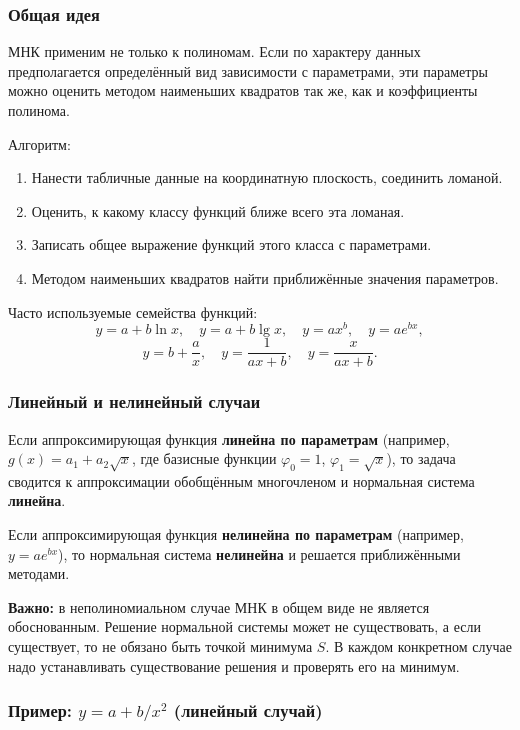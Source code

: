 \subsubsection*{Общая идея}

МНК применим не только к полиномам. Если по характеру данных предполагается определённый вид зависимости с параметрами, эти параметры можно оценить методом наименьших квадратов так же, как и коэффициенты полинома.

Алгоритм:
\begin{enumerate}
    \item Нанести табличные данные на координатную плоскость, соединить ломаной.
    \item Оценить, к какому классу функций ближе всего эта ломаная.
    \item Записать общее выражение функций этого класса с параметрами.
    \item Методом наименьших квадратов найти приближённые значения параметров.
\end{enumerate}

Часто используемые семейства функций:
\[
    y = a + b\ln x, \quad y = a + b\lg x, \quad y = a x^b, \quad y = a e^{bx},
\]
\[
    y = b + \frac{a}{x}, \quad y = \frac{1}{ax + b}, \quad y = \frac{x}{ax + b}.
\]

\subsubsection*{Линейный и нелинейный случаи}

Если аппроксимирующая функция \textbf{линейна по параметрам} (например, $g(x) = a_1 + a_2 \sqrt{x}$, где базисные функции $\varphi_0 = 1$, $\varphi_1 = \sqrt{x}$), то задача сводится к аппроксимации обобщённым многочленом и нормальная система \textbf{линейна}.

Если аппроксимирующая функция \textbf{нелинейна по параметрам} (например, $y = a e^{bx}$), то нормальная система \textbf{нелинейна} и решается приближёнными методами.

\textbf{Важно:} в неполиномиальном случае МНК в общем виде не является обоснованным. Решение нормальной системы может не существовать, а если существует, то не обязано быть точкой минимума $S$. В каждом конкретном случае надо устанавливать существование решения и проверять его на минимум.

\subsubsection*{Пример: $y = a + b/x^2$ (линейный случай)}

